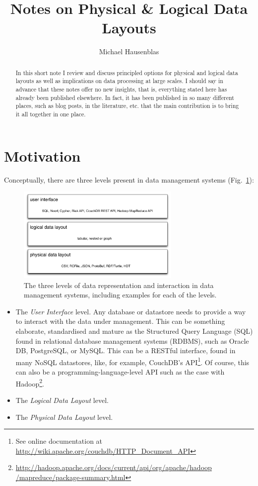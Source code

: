 \documentclass{llncs}
\begin{document}
\title{Notes on Physical \& Logical Data Layouts}
	\author{
	Michael Hausenblas 
	}
\maketitle

\begin{abstract}
In this short note I review and discuss principled options for physical and
logical data layouts as well as implications on data processing at large scales.
I should say in advance that these notes offer no new insights, that is, 
everything stated here has already been published elsewhere. In fact, it has
been published in so many different places, such as blog posts, in the 
literature, etc. that the main contribution is to bring it all together in one
place.
\end{abstract}

\section{Motivation}
\label{sec:mot}
Conceptually, there are three levels present in data management systems
(Fig.~\ref{fig:data-layers}):
\begin{figure}[h!]
\centering
\includegraphics[width=0.7\textwidth]{data-layers}
\caption{The three levels of data representation and interaction in data 
management systems, including examples for each of the levels.}
\label{fig:data-layers}
\end{figure}
\begin{itemize}
\item The \emph{User Interface} level. Any database or datastore needs 
to provide a way to interact with the data under management. This can be 
something elaborate, standardised and mature as the Structured Query Language 
(SQL) found in relational database management systems (RDBMS), such as 
Oracle DB, PostgreSQL, or MySQL. This can be a RESTful interface, found in many 
NoSQL datastores, like, for example, CouchDB's API\footnote{See online 
documentation at \url{http://wiki.apache.org/couchdb/HTTP_Document_API}}. Of
course, this can also be a programming-language-level API such as the case with
Hadoop\footnote{\url{http://hadoop.apache.org/docs/current/api/org/apache/hadoop
/mapreduce/package-summary.html}}.
\item The \emph{Logical Data Layout} level.
\item The \emph{Physical Data Layout} level.
\end{itemize}
\end{document}

